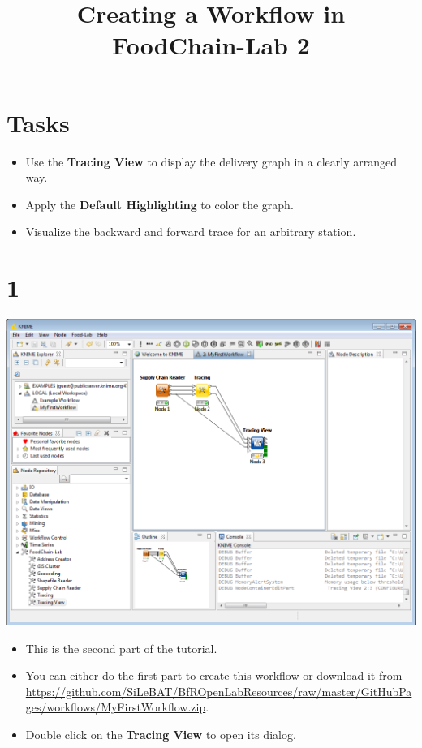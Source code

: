 \documentclass{beamer}
\title{Creating a Workflow in FoodChain-Lab 2}
\date{}
\begin{document}
\maketitle

\section{Tasks}
\begin{frame}
	\begin{itemize}
		\item Use the \textbf{Tracing View} to display the delivery graph in a clearly arranged way.
		\item Apply the \textbf{Default Highlighting} to color the graph.
		\item Visualize the backward and forward trace for an arbitrary station.
	\end{itemize}
\end{frame}
 
\section{1}
\begin{frame}
	\begin{center}
  		\includegraphics[height=0.6\textheight]{1.png}
	\end{center}
	\begin{itemize}
		\item This is the second part of the tutorial.
		\item You can either do the first part to create this workflow or download it from \url{https://github.com/SiLeBAT/BfROpenLabResources/raw/master/GitHubPages/workflows/MyFirstWorkflow.zip}.
		\item Double click on the \textbf{Tracing View} to open its dialog.
	\end{itemize}
\end{frame}
\end{document}
